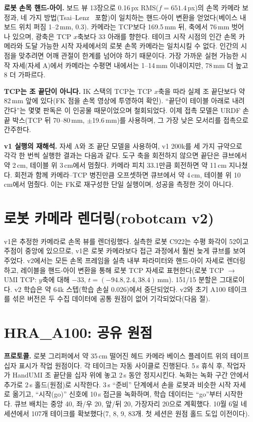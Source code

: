 \documentclass[conference,10pt]{IEEEtran}
\newcommand{\mm}{\,mm\xspace}
\begin{document}
\textbf{로봇 손목 핸드-아이.} 보드 뷰 13장으로 0.16\,px RMS($f=651.4$\,px)의 손목 카메라 보정과, 네 가지 방법(Tsai--Lenz~\cite{tsai1989handeye}
포함)이 일치하는 핸드-아이 변환을 얻었다(베이스 내 보드 위치 퍼짐 1--2\mm, 0.3\textdegree). 카메라는 TCP보다 169.5\mm
뒤, 축에서 76\mm 벗어나 있으며, 광축은 TCP $x$축보다 33\textdegree{} 아래를 향한다. 테이크 시작 시점의 인간 손목 카메라와
도달 가능한 시작 자세에서의 로봇 손목 카메라는 일치시킬 수 없다. 인간의 시점을 맞추려면 어깨 관절이 한계를 넘어야 하기
때문이다. 가장 가까운 실현 가능한 시작 자세(자세 A)에서 카메라는 수평면 내에서는 1--14\mm 이내이지만, 78\mm 더 높고
8\textdegree{} 더 가파르다.

\textbf{TCP는 조 끝단이 아니다.} IK 스택의 TCP는 TCP $x$축을 따라 실제 조 끝단보다 약 82\mm 앞에 있다(FK 점을 손목
영상에 투영하여 확인). ``끝단이 테이블 아래로 내려간다''는 몇몇 판독은 이 인공물 때문이었으며 철회되었다. 이제 접촉 모델은
URDF 손끝 박스(TCP 뒤 70--80\mm, $\pm$19.6\mm)를 사용하며, 그 가장 낮은 모서리를 접촉으로 간주한다.

\textbf{v1 실행의 재해석.} 자세 A와 조 끝단 모델을 사용하여, v1 200k를 세 가지 규약으로 각각 한 번씩 실행한 결과는
다음과 같다. 도구 축을 회전하지 않으면 끝단은 큐브에서 약 2\,cm, 테이블 위 3\,cm에서 멈췄다. 카메라 피치 33.1\textdegree{}만큼
회전하면 약 11\,cm 지나쳤다. 회전과 함께 카메라--TCP 병진만큼 오프셋하면 큐브에서 약 4\,cm, 테이블 위 10\,cm에서 멈췄다.
이는 FK로 재구성한 단일 실행이며, 성공을 측정한 것이 아니다.

\section{로봇 카메라 렌더링(robotcam v2)}\label{sec:v2}
v1은 추정한 카메라로 손목 뷰를 렌더링했다. 실측한 로봇 C922는 수평 화각이 52\textdegree{}이고 주점이 중앙에 있으므로, v1은
로봇 카메라보다 접근 과정에서 훨씬 늦게 큐브를 보여 주었다. v2에서는 모든 손목 프레임을 실측 내부 파라미터와 핸드-아이
자세로 렌더링하고, 레이블을 핸드-아이 변환을 통해 로봇 TCP 자세로 표현한다(로봇 TCP $\to$ UMI TCP: $y$축에 대해
$-33$\textdegree, $t=(-94.8, 2.4, 38.4)$\mm). 151/15 분할은 그대로이다. v2 학습은 약 64k 스텝(학습 손실 0.026)에서
중단되었다. v2와 초기 A100 테이크를 섞은 버전은 두 수집 데이터에 공통 원점이 없어 기각되었다(다음 절).

\section{HRA\_A100: 공유 원점}\label{sec:a100}
\textbf{프로토콜.} 로봇 그리퍼에서 약 35\,cm 떨어진 헤드 카메라 베이스 플레이트 위의 테이프 십자 표시가 작업 원점이다.
각 테이크는 자동 사이클로 진행된다. 5\,s 휴식 후, 작업자가 HandUMI 조 끝단을 십자 위에 놓고 2\,s 동안 정지시킨다. 녹화는
녹화 구간 안에서 추가로 2\,s 홀드(원점)로 시작한다. 3\,s ``준비'' 단계에서 손을 로봇과 비슷한 시작 자세로 옮기고,
``시작(go)'' 신호에 10\,s 접근을 녹화하며, 학습 데이터는 ``go''부터 시작한다. 큐브 배치는 중앙 40, 좌/우 20, 앞/뒤 20,
가장자리 20으로 계획했다. 10월 6일 네 세션에서 107개 테이크를 확보했다(7, 8, 9, 83개. 첫 세션은 원점 홀드 도입 이전이다).
\end{document}
